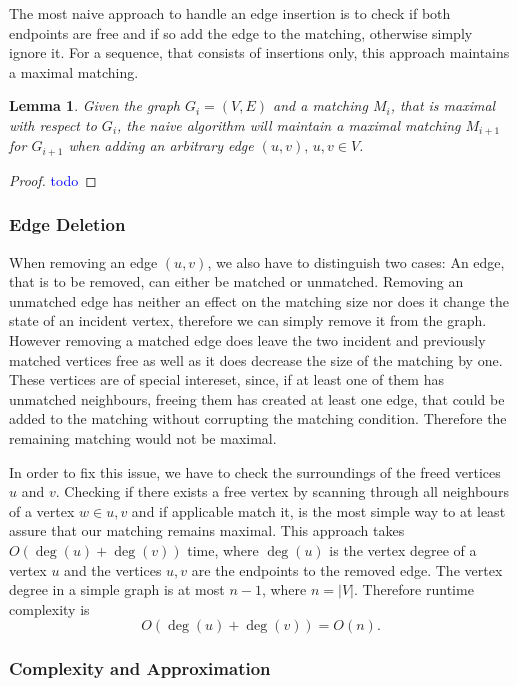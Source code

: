\documentclass{article}      %
\newcommand\todo[1]{\textcolor{blue}{#1}}
\newtheorem{lemma}{Lemma}[section]
\begin{document}
The most naive approach to handle an edge insertion is to check if both endpoints are free and if so add the edge to the matching, otherwise simply ignore it. For a sequence, that consists of insertions only, this approach maintains a maximal matching.

\begin{lemma}
Given the graph $G_i=(V,E)$ and a matching $M_i$, that is maximal with respect to $G_i$, the naive algorithm will maintain a maximal matching $M_{i+1}$ for $G_{i+1}$ when adding an arbitrary edge $(u,v), \, u,v \in V$.
\end{lemma}

\begin{proof}
\todo{todo}
\end{proof}

\subsubsection{Edge Deletion}
\label{sec:naive-edge-out}

When removing an edge $(u,v)$, we also have to distinguish two cases: An edge, that is to be removed, can either be matched or unmatched. Removing an unmatched edge has neither an effect on the matching size nor does it change the state of an incident vertex, therefore we can simply remove it from the graph. However removing a matched edge does leave the two incident and previously matched vertices free as well as it does decrease the size of the matching by one. These vertices are of special intereset, since, if at least one of them has unmatched neighbours, freeing them has created at least one edge, that could be added to the matching without corrupting the matching condition. Therefore the remaining matching would not be maximal. 

In order to fix this issue, we have to check the surroundings of the freed vertices $u$ and $v$. Checking if there exists a free vertex by scanning through all neighbours of a vertex $w \in {u,v}$ and if applicable match it, is the most simple way to at least assure that our matching remains maximal. This approach takes $O(\deg(u) + \deg(v))$ time, where $\deg(u)$ is the vertex degree of a vertex $u$ and the vertices $u,v$ are the endpoints to the removed edge. The vertex degree in a simple graph is at most $n-1$, where $n=|V|$. Therefore runtime complexity is 
$$
	O(\deg(u) + \deg(v)) = O(n).
$$

\subsubsection{Complexity and Approximation}
\label{sec:naive-complx-approx}
\end{document}
